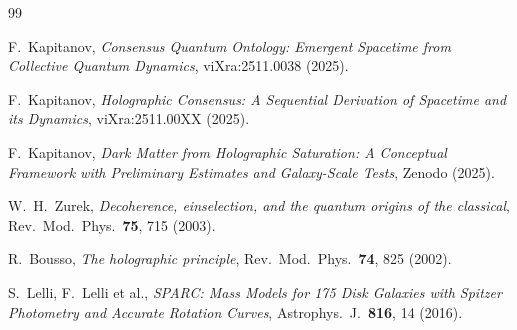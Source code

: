 \documentclass[12pt,a4paper]{article}
\begin{document}
\begin{thebibliography}{99}

F.~Kapitanov,
\emph{Consensus Quantum Ontology: Emergent Spacetime from Collective Quantum Dynamics},
viXra:2511.0038 (2025).

F.~Kapitanov,
\emph{Holographic Consensus: A Sequential Derivation of Spacetime and its Dynamics},
viXra:2511.00XX (2025).

F.~Kapitanov,
\emph{Dark Matter from Holographic Saturation: A Conceptual Framework with Preliminary Estimates and Galaxy-Scale Tests},
Zenodo (2025).

W.~H.~Zurek,
\emph{Decoherence, einselection, and the quantum origins of the classical},
Rev.\ Mod.\ Phys.\ \textbf{75}, 715 (2003).

R.~Bousso,
\emph{The holographic principle},
Rev.\ Mod.\ Phys.\ \textbf{74}, 825 (2002).

S.~Lelli, F.~Lelli et al.,
\emph{SPARC: Mass Models for 175 Disk Galaxies with Spitzer Photometry and Accurate Rotation Curves},
Astrophys.\ J.\ \textbf{816}, 14 (2016).

\end{thebibliography}
\end{document}
